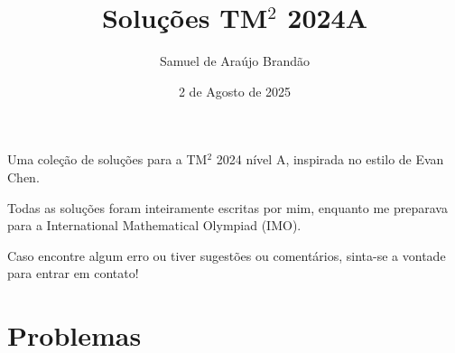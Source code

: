 \documentclass[12pt]{article}
\title{\sffamily\bfseries{Soluções TM$^2$ 2024A}}
\author{Samuel de Araújo Brandão}
\date{2 de Agosto de 2025}
\begin{document}
  \maketitle

  Uma coleção de soluções para a TM$^2$ 2024 nível A, inspirada no estilo de Evan Chen.

  Todas as soluções foram inteiramente escritas por mim, enquanto me preparava para a
  International Mathematical Olympiad (IMO).

  Caso encontre algum erro ou tiver sugestões ou comentários, sinta-se a vontade 
  para entrar em contato!

  \tableofcontents
  \clearpage

  \section{\textsf{Problemas}}
\end{document}
